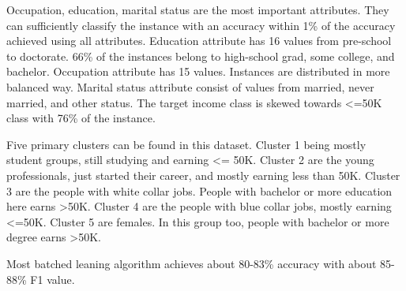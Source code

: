 Occupation, education, marital status are the most important attributes. They can sufficiently classify the instance with an accuracy within 1\% of the accuracy achieved using all attributes. Education attribute has 16 values from pre-school to doctorate. 66\% of the instances belong to high-school grad, some college, and bachelor. Occupation attribute has 15 values. Instances are distributed in more balanced way. Marital status attribute consist of values from married, never married, and other status. The target income class is skewed towards <=50K class with 76\% of the instance.

Five primary clusters can be found in this dataset. Cluster 1 being mostly student groups, still studying and earning <= 50K. Cluster 2 are the young professionals, just started their career, and mostly earning less than 50K. Cluster 3 are the people with white collar jobs. People with bachelor or more education here earns >50K. Cluster 4 are the people with blue collar jobs, mostly earning <=50K. Cluster 5 are females. In this group too, people with bachelor or more degree earns >50K.

Most batched leaning algorithm achieves about 80-83\% accuracy with about 85-88\% F1 value.